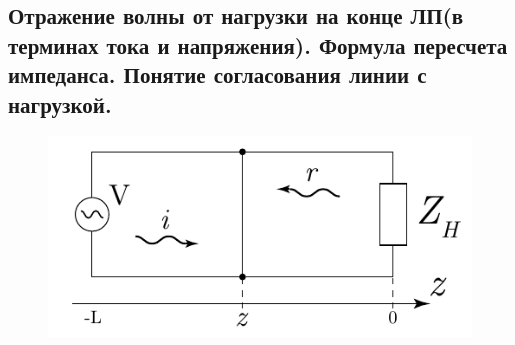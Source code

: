 \subsection{Отражение волны от нагрузки на конце ЛП(в терминах тока и напряжения). Формула пересчета импеданса. Понятие согласования линии с нагрузкой.}
\begin{figure}[h!]
    \centering
    \includegraphics[width = .6\linewidth]{img/12-2.pdf}    
    \caption{}
\end{figure}

